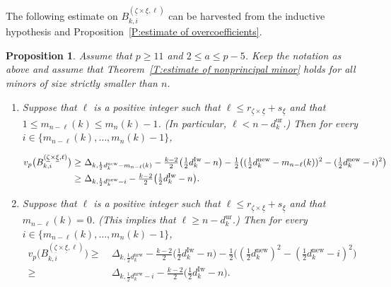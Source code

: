 \documentclass[12pt]{amsart}
\newtheorem{lemma}[subsection]{Lemma}
\newtheorem{proposition}[subsection]{Proposition}
\theoremstyle{definition}
\numberwithin{equation}{subsection}
\newcommand{\new}{\mathrm{new}}
\newcommand{\Iw}{\mathrm{Iw}}
\newcommand{\ur}{\mathrm{ur}}
\begin{document}
The following estimate on $B_{k,i}^{(\underline \zeta \times \underline \xi, \ell)}$ can be harvested from the inductive hypothesis and Proposition~\ref{P:estimate of overcoefficients}.
\begin{proposition}
\label{P:estimate of smaller minors}
Assume that $p \geq 11$ and $2 \leq a \leq p-5$.
Keep the notation as above and assume that Theorem~\ref{T:estimate of nonprincipal minor} holds for all minors of size strictly smaller than $n$.
\begin{enumerate}
\item Suppose that $\ell$ is a positive integer such that $\ell \leq  r_{\underline \zeta \times \underline \xi}+ s_{\underline \xi}$ and that $1 \leq m_{n-\ell}(k) \leq m_n(k)-1$. (In particular, $\ell < n-d_k^\ur$.) Then for every $i \in \{ m_{n-\ell}(k), \dots, m_n(k)-1\}$,
\begin{small}
\begin{align}
\label{E:estimate of smaller minors}
v_p\big( B_{k,i}^{(\underline \zeta \times \underline \xi, \ell)}\big) \geq\ & \Delta_{k, \frac 12d_k^\new -m_{n-\ell}(k)} -  \tfrac{k-2}2\big( \tfrac 12d_k^\Iw - n\big) -\tfrac12\big( (\tfrac 12d_{k}^\new-m_{n-\ell}(k))^2 - (\tfrac 12d_{k}^\new-i)^2\big)\hspace{-10pt}
\\
\label{E:estimate of smaller minors weak} \geq\ &  \Delta_{k, \frac 12d_k^\new -i} - \tfrac{k-2}2\big( \tfrac 12d_k^\Iw - n\big).
	\end{align}
\end{small}
\item Suppose that $\ell$ is a positive integer such that $\ell \leq r_{\underline \zeta \times \underline \xi}+ s_{\underline \xi}$ and that $m_{n-\ell}(k)=0$. (This implies that $\ell \geq n-d_k^\ur$.)
 Then for every $i \in \{ m_{n-\ell}(k), \dots, m_n(k)-1\}$,
\begin{align}
\label{E:estimate of smaller minors when m n-ell (k)=0}
v_p\big( B_{k,i}^{(\underline \zeta \times \underline \xi, \ell)}\big) \geq\ &  \Delta_{k, \frac 12d_k^\new} -  \tfrac{k-2}2\big( \tfrac 12d_k^\Iw - n\big)- \tfrac12\big( (\tfrac 12d_{k}^\new)^2 - (\tfrac 12d_{k}^\new-i)^2\big)
    \\
    \label{E:estimate of smaller minors weak when m n-ell (k)=0} \geq\ &  \Delta_{k, \frac 12d_k^\new -i} - \tfrac{k-2}2\big( \tfrac 12d_k^\Iw - n\big).
	\end{align} 
\end{enumerate}
\end{proposition}
\end{document}
